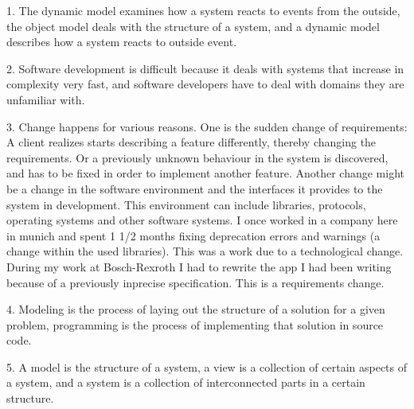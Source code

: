 \documentclass[11pt,a4paper]{article}
\begin{document}
\thispagestyle{empty}
\pagestyle{empty}

1. The dynamic model examines how a system reacts to events from the
outside, the object model deals with the structure of a system, and a
dynamic model describes how a system reacts to outside event.

2. Software development is difficult because it deals with systems that
increase in complexity very fast, and software developers have to deal
with domains they are unfamiliar with.

3. Change happens for various reasons. One is the sudden change of
requirements: A client realizes starts describing a feature differently,
thereby changing the requirements. Or a previously unknown behaviour
in the system is discovered, and has to be fixed in order to implement
another feature. Another change might be a change in the software
environment and the interfaces it provides to the system in development.
This environment can include libraries, protocols, operating systems
and other software systems. I once worked in a company here in munich
and spent 1 1/2 months fixing deprecation errors and warnings (a change
within the used libraries). This was a work due to a technological change.
During my work at Bosch-Rexroth I had to rewrite the app I had been
writing because of a previously inprecise specification. This is a
requirements change.

4. Modeling is the process of laying out the structure of a solution
for a given problem, programming is the process of implementing that
solution in source code.

5. A model is the structure of a system, a view is a collection of certain
aspects of a system, and a system is a collection of interconnected
parts in a certain structure.
\end{document}

